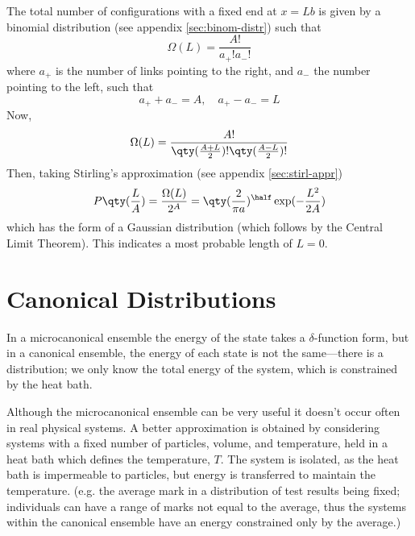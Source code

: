 \begin{example}
  The total number of configurations with a fixed end at $x = Lb$ is
  given by a binomial distribution (see appendix
  \ref{sec:binom-distr}) such that
  \begin{equation}
    \label{eq:7}
    \Omega(L) = \frac{A!}{a_+! a_-!}
  \end{equation}
  where $a_+$ is the number of links pointing to the right, and $a_-$
  the number pointing to the left, such that 
  \[ a_+ + a_- = A, \quad a_+ - a_- = L \]
  Now,
  \begin{equation}
    \label{eq:8}
    \Omega(L) = \frac{A!}{\qty(\frac{A+L}{2})! \qty(\frac{A-L}{2})!}
  \end{equation}
  Then, taking Stirling's approximation (see appendix
  \ref{sec:stirl-appr}) 
  \begin{equation}
    \label{eq:9}
    P\qty(\frac{L}{A}) = \frac{\Omega(L)}{2^A} = \qty(\frac{2}{\pi a})^{\half} \exp( - \frac{L^2}{2A} )
  \end{equation}
  which has the form of a Gaussian distribution (which follows by the
  Central Limit Theorem). This indicates a most probable length of
  $L=0$.
\end{example}

\section{Canonical Distributions}
\label{sec:canon-distr}


In a microcanonical ensemble the energy of the state takes a
$\delta$-function form, but in a canonical ensemble, the energy of
each state is not the same---there is a distribution; we only know the
total energy of the system, which is constrained by the heat bath.

Although the microcanonical ensemble can be very useful it doesn't
occur often in real physical systems. A better approximation is
obtained by considering systems with a fixed number of particles,
volume, and temperature, held in a heat bath which defines the
temperature, $T$. The system is isolated, as the heat bath is
impermeable to particles, but energy is transferred to maintain the
temperature. (e.g. the average mark in a distribution of test results
being fixed; individuals can have a range of marks not equal to the
average, thus the systems within the canonical ensemble have an energy
constrained only by the average.)

